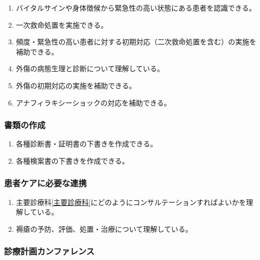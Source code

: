 \begin{enumerate}
\def\labelenumi{\arabic{enumi}.}
\tightlist
\item
  バイタルサインや身体徴候から緊急性の高い状態にある患者を認識できる。
\item
  一次救命処置を実施できる。
\item
  頻度・緊急性の高い患者に対する初期対応（二次救命処置を含む）の実施を補助できる。
\item
  外傷の病態生理と診断について理解している。
\item
  外傷の初期対応の実施を補助できる。
\item
  アナフィラキシーショックの対応を補助できる。
\end{enumerate}

\hypertarget{ux66f8ux985eux306eux4f5cux6210}{%
\subsubsection{書類の作成}\label{ux66f8ux985eux306eux4f5cux6210}}

\begin{enumerate}
\def\labelenumi{\arabic{enumi}.}
\tightlist
\item
  各種診断書・証明書の下書きを作成できる。
\item
  各種検案書の下書きを作成できる。
\end{enumerate}

\hypertarget{ux60a3ux8005ux30b1ux30a2ux306bux5fc5ux8981ux306aux9023ux643a}{%
\subsubsection{患者ケアに必要な連携}\label{ux60a3ux8005ux30b1ux30a2ux306bux5fc5ux8981ux306aux9023ux643a}}

\begin{enumerate}
\def\labelenumi{\arabic{enumi}.}
\tightlist
\item
  主要診療科\ref{主要診療科}にどのようにコンサルテーションすればよいかを理解している。
\item
  褥瘡の予防、評価、処置・治療について理解している。
\end{enumerate}

\hypertarget{ux8a3aux7642ux8a08ux753bux30abux30f3ux30d5ux30a1ux30ecux30f3ux30b9}{%
\subsubsection{診療計画カンファレンス}\label{ux8a3aux7642ux8a08ux753bux30abux30f3ux30d5ux30a1ux30ecux30f3ux30b9}}

